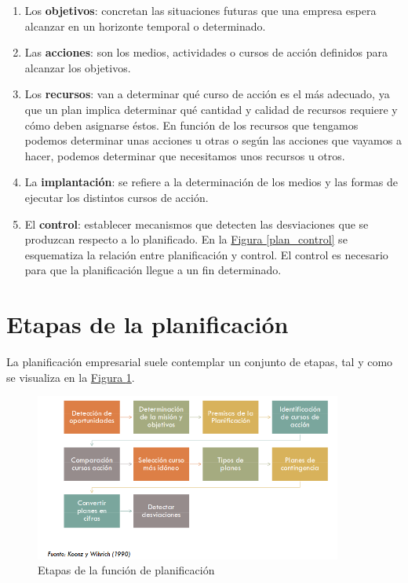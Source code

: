 \documentclass[12pt,a4paper,spanish]{report}
\begin{document}
		\begin{enumerate}[1.]
			\item Los \textbf{objetivos}: concretan las situaciones futuras que una empresa espera alcanzar en un horizonte temporal o determinado.

			\item Las \textbf{acciones}: son los medios, actividades o cursos de acción definidos para alcanzar los objetivos.

			\item Los \textbf{recursos}: van a determinar qué curso de acción es el más adecuado, ya que un plan implica determinar qué cantidad y calidad de recursos requiere y cómo deben asignarse éstos. En función de los recursos que tengamos podemos determinar unas acciones u otras o según las acciones que vayamos a hacer, podemos determinar que necesitamos unos recursos u otros.

			\item La \textbf{implantación}: se refiere a la determinación de los medios y las formas de ejecutar los distintos cursos de acción.

			\item El \textbf{control}: establecer mecanismos que detecten las desviaciones que se produzcan respecto a lo planificado. En la \hyperref[plan_control]{Figura \ref*{plan_control}} se esquematiza la relación entre planificación y control. El control es necesario para que la planificación llegue a un fin determinado. 
		\end{enumerate}

	\section{\textcolor[rgb]{0.3,0.6,0.4}Etapas de la planificación}
		La planificación empresarial suele contemplar un conjunto de etapas, tal y como se visualiza en la \hyperref[planificacion]{Figura \ref*{planificacion}}.

		\begin{figure}
			 	\centering
			 		\includegraphics[width=0.9\textwidth]{5}
			 	\caption{Etapas de la función de planificación}
			 	\label{planificacion}
		\end{figure}
\end{document}
